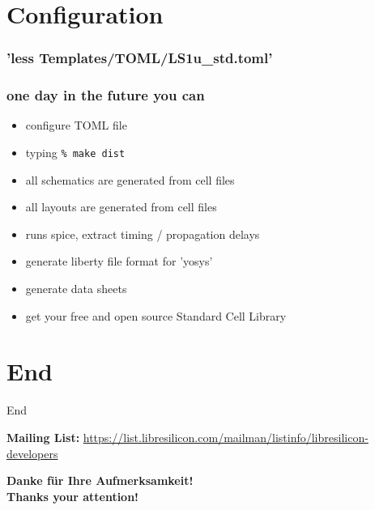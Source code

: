 \documentclass[aspectratio=169]{beamer}
\begin{document}
\section{Configuration}


\begin{frame}
\frametitle{'less Templates/TOML/LS1u\_std.toml'}
\end{frame}


\begin{frame}
\frametitle{one day in the future you can}
    \begin{itemize}
        \item configure TOML file
        \item typing \texttt{\% make dist} \newline
        \item all schematics are generated from cell files
        \item all layouts are generated from cell files
        \item runs spice, extract timing / propagation delays
        \item generate liberty file format for 'yosys'
        \item generate data sheets
        \item get your free and open source Standard Cell Library
    \end{itemize}
\end{frame}

\section{End}


\begin{frame}{End}
    \begin{center}
        \textbf{Mailing List:} \url{https://list.libresilicon.com/mailman/listinfo/libresilicon-developers}
    \end{center}
    \vfill
    \begin{center}
        \textbf{Danke für Ihre Aufmerksamkeit!} \\
        \textbf{Thanks your attention!} \\
    \end{center}
\end{frame}
\end{document}
